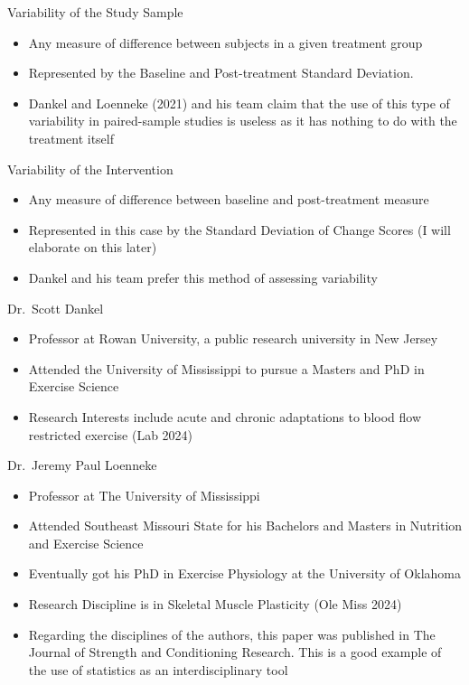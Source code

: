 \documentclass[
  ignorenonframetext,
  aspectratio=169,
]{beamer}
\providecommand{\tightlist}{%
  \setlength{\itemsep}{0pt}\setlength{\parskip}{0pt}}
\begin{document}
\begin{frame}{Variability of the Study Sample}
\protect\hypertarget{variability-of-the-study-sample}{}
\begin{itemize}
\tightlist
\item
  Any measure of difference between subjects in a given treatment group
\item
  Represented by the Baseline and Post-treatment Standard Deviation.
\item
  Dankel and Loenneke (2021) and his team claim that the use of this
  type of variability in paired-sample studies is useless as it has
  nothing to do with the treatment itself
\end{itemize}
\end{frame}

\begin{frame}{Variability of the Intervention}
\protect\hypertarget{variability-of-the-intervention}{}
\begin{itemize}
\tightlist
\item
  Any measure of difference between baseline and post-treatment measure
\item
  Represented in this case by the Standard Deviation of Change Scores (I
  will elaborate on this later)
\item
  Dankel and his team prefer this method of assessing variability
\end{itemize}
\end{frame}

\begin{frame}{Dr.~Scott Dankel}
\protect\hypertarget{dr.-scott-dankel}{}
\begin{itemize}
\tightlist
\item
  Professor at Rowan University, a public research university in New
  Jersey
\item
  Attended the University of Mississippi to pursue a Masters and PhD in
  Exercise Science
\item
  Research Interests include acute and chronic adaptations to blood flow
  restricted exercise (Lab 2024)
\end{itemize}
\end{frame}

\begin{frame}{Dr.~Jeremy Paul Loenneke}
\protect\hypertarget{dr.-jeremy-paul-loenneke}{}
\begin{itemize}
\item
  Professor at The University of Mississippi
\item
  Attended Southeast Missouri State for his Bachelors and Masters in
  Nutrition and Exercise Science
\item
  Eventually got his PhD in Exercise Physiology at the University of
  Oklahoma
\item
  Research Discipline is in Skeletal Muscle Plasticity (Ole Miss 2024)
\item
  Regarding the disciplines of the authors, this paper was published in
  The Journal of Strength and Conditioning Research. This is a good
  example of the use of statistics as an interdisciplinary tool
\end{itemize}
\end{frame}
\end{document}
